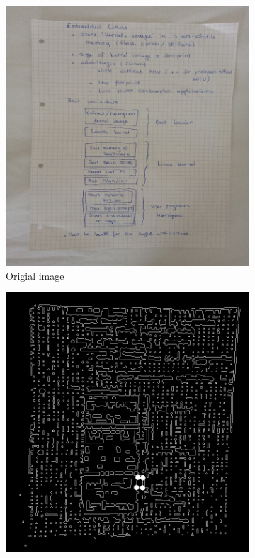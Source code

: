 \documentclass{scrartcl}
\begin{document}
  \begin{figure}[!htbp]
    \centering
    \begin{subfigure}[b]{0.3\textwidth}
      \centering
      \includegraphics[width=\textwidth]{pictures/results/white1/original.png}
      \caption{Origial image}
    \end{subfigure}
    \begin{subfigure}[b]{0.3\textwidth}
      \centering
      \includegraphics[width=\textwidth]{pictures/results/white1/edge-detector.png}

\end{subfigure}
\end{figure}
\end{document}
